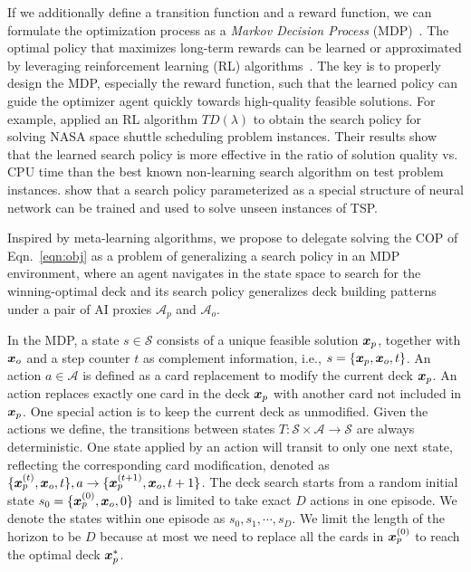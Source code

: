 If we additionally define a transition function and a reward function, we can formulate the optimization process as a \textit{Markov Decision Process} (MDP)~\citep{bellman1957markovian}. The optimal policy that maximizes long-term rewards can be learned or approximated by leveraging reinforcement learning (RL) algorithms~\citep{sutton1998reinforcement}. The key is to properly design the MDP, especially the reward function, such that the learned policy can guide the optimizer agent quickly towards high-quality feasible solutions. For example, \textcite{zhang2000solving} applied an RL algorithm $TD(\lambda)$ to obtain the search policy for solving NASA space shuttle scheduling problem instances. Their results show that the learned search policy is more effective in the ratio of solution quality vs. CPU time than the best known non-learning search algorithm on test problem instances. \textcite{bello2016neural} show that a search policy parameterized as a special structure of neural network can be trained and used to solve unseen instances of TSP. 

Inspired by meta-learning algorithms, we propose to delegate solving the COP of Eqn.~\ref{eqn:obj} as a problem of generalizing a search policy in an MDP environment, where an agent navigates in the state space to search for the winning-optimal deck and its search policy generalizes deck building patterns under a pair of AI proxies $\mathcal{A}_p$ and $\mathcal{A}_o$. 

In the MDP, a state $s \in \mathcal{S}$ consists of a unique feasible solution $\boldsymbol{x}_p$, together with $\boldsymbol{x}_o$ and a step counter $t$ as complement information, i.e., $s=\{\boldsymbol{x}_p, \boldsymbol{x}_o, t\}$. An action $a \in \mathcal{A}$ is defined as a card replacement to modify the current deck $\boldsymbol{x}_p$. An action replaces exactly one card in the deck $\boldsymbol{x}_p$ with another card not included in $\boldsymbol{x}_p$. One special action is to keep the current deck as unmodified. Given the actions we define, the transitions between states $T: \mathcal{S} \times \mathcal{A} \rightarrow \mathcal{S}$ are always deterministic. One state applied by an action will transit to only one next state, reflecting the corresponding card modification, denoted as $\{\boldsymbol{x}^{(t)}_p, \boldsymbol{x}_o, t\}, a \rightarrow \{\boldsymbol{x}^{(t+1)}_p, \boldsymbol{x}_o, t+1\}$. The deck search starts from a random initial state $s_0=\{\boldsymbol{x}_p^{(0)}, \boldsymbol{x}_o, 0\}$ and is limited to take exact $D$ actions in one episode. We denote the states within one episode as $s_0, s_1, \cdots, s_D$. We limit the length of the horizon to be $D$ because at most we need to replace all the cards in $\boldsymbol{x}_p^{(0)}$ to reach the optimal deck $\boldsymbol{x}_p^*$. 


